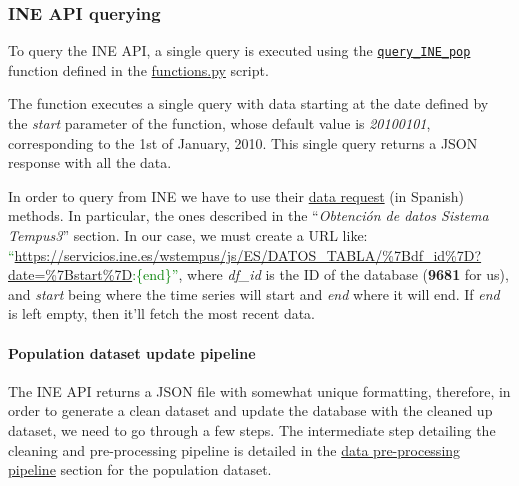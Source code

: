 \documentclass[
  a4paper]{article}
\begin{document}
\hypertarget{ine-api-querying}{%
\subsubsection{INE API querying}\label{ine-api-querying}}

To query the INE API, a single query is executed using the
\href{https://github.com/dreth/tfm_uc3m/blob/report_ref/api/functions.py\#L146}{\texttt{query\_INE\_pop}}
function defined in the
\href{https://github.com/dreth/tfm_uc3m/blob/main/api/functions.py}{functions.py}
script.

The function executes a single query with data starting at the date
defined by the \emph{start} parameter of the function, whose default
value is \emph{20100101}, corresponding to the 1st of January, 2010.
This single query returns a JSON response with all the data.

In order to query from INE we have to use their
\href{https://www.ine.es/dyngs/DataLab/en/manual.html?cid=1259945947373}{data
request} (in Spanish) methods. In particular, the ones described in the
``\emph{Obtención de datos Sistema Tempus3}'' section. In our case, we
must create a URL like:
\textcolor{green}{``\url{https://servicios.ine.es/wstempus/js/ES/DATOS_TABLA/\%7Bdf_id\%7D?date=\%7Bstart\%7D}:\{end\}''},
where \emph{df\_id} is the ID of the database (\textbf{9681} for us),
and \emph{start} being where the time series will start and \emph{end}
where it will end. If \emph{end} is left empty, then it'll fetch the
most recent data.

\hypertarget{population-dataset-update-pipeline}{%
\paragraph{Population dataset update
pipeline}\label{population-dataset-update-pipeline}}

The INE API returns a JSON file with somewhat unique formatting,
therefore, in order to generate a clean dataset and update the database
with the cleaned up dataset, we need to go through a few steps. The
intermediate step detailing the cleaning and pre-processing pipeline is
detailed in the \protect\hyperlink{PopDatasetPipeline}{data
pre-processing pipeline} section for the population dataset.
\end{document}
